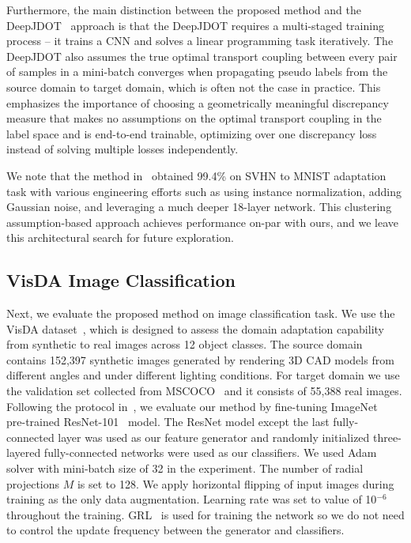 \documentclass[10pt,twocolumn,letterpaper]{article}
\begin{document}
Furthermore, the main distinction between the proposed method and the DeepJDOT~\cite{damodaran2018deepjdot} approach is that the DeepJDOT requires a multi-staged training process -- it trains a CNN and solves a linear programming task iteratively. The DeepJDOT also assumes the true optimal transport coupling between every pair of samples in a mini-batch converges when propagating pseudo labels from the source domain to target domain, which is often not the case in practice. This emphasizes the importance of choosing a geometrically meaningful discrepancy measure that makes no assumptions on the optimal transport coupling in the label space and is end-to-end trainable, optimizing over one discrepancy loss instead of solving multiple losses independently.

We note that the method in~\cite{shu2018dirt} obtained 99.4\% on SVHN to MNIST adaptation task with various engineering efforts such as using instance normalization, adding Gaussian noise, and leveraging a much deeper 18-layer network. This clustering assumption-based approach achieves performance on-par with ours, and we leave this architectural search for future exploration.



\subsection{VisDA Image Classification}
Next, we evaluate the proposed method on image classification task. We use the VisDA dataset~\cite{visda2017}, which is designed to assess the domain adaptation capability from synthetic to real images across 12 object classes. The source domain contains 152,397 synthetic images generated by rendering 3D CAD models from different angles and under different lighting conditions. For target domain we use the validation set collected from MSCOCO~\cite{lin2014microsoft} and it consists of 55,388 real images.
Following the protocol in~\cite{saito2017maximum}, we evaluate our method by fine-tuning ImageNet~\cite{deng2009imagenet} pre-trained ResNet-101~\cite{he2016deep} model. The ResNet model except the last fully-connected layer was used as our feature generator and randomly initialized three-layered fully-connected networks were used as our classifiers. We used Adam solver with mini-batch size of 32 in the experiment. The number of radial projections $M$ is set to 128. We apply horizontal flipping of input images during training as the only data augmentation. Learning rate was set to value of 10$^{-6}$ throughout the training. GRL~\cite{ganin2014unsupervised} is used for training the network so we do not need to control the update frequency between the generator and classifiers.
\end{document}
